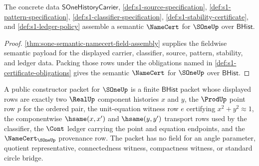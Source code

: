 \begin{theorem}
\label{thm:sone-history-semantic-namecert}
The concrete data $\mathsf{SOneHistoryCarrier}$,
\autoref{def:s1-source-specification}, \autoref{def:s1-pattern-specification},
\autoref{def:s1-classifier-specification},
\autoref{def:s1-stability-certificate}, and \autoref{def:s1-ledger-policy}
assemble a semantic $\NameCert$ for $\SOneUp$ over $\mathsf{BHist}$.
\end{theorem}
\begin{proof}
\autoref{thm:sone-semantic-namecert-field-assembly} supplies the fieldwise
semantic payload for the displayed carrier, classifier, source, pattern,
stability, and ledger data. Packing those rows under the obligations named in
\autoref{def:s1-certificate-obligations} gives the semantic $\NameCert$ for
$\SOneUp$ over $\mathsf{BHist}$.
\end{proof}

\begin{definition}
\label{def:sone-public-constructor-packet}
A public constructor packet for $\SOneUp$ is a finite $\mathsf{BHist}$ packet
whose displayed rows are exactly two $\RealUp$ component histories $x$ and $y$,
the $\ProdUp$ point row $p$ for the ordered pair, the unit-equation witness row
$e$ certifying $x^{2}+y^{2}\approx 1$, the componentwise $\hsame(x,x')$ and
$\hsame(y,y')$ transport rows used by the classifier, the $\Cont$ ledger
carrying the point and equation endpoints, and the $\NameCert_{\SOneUp}$
provenance row. The packet has no field for an angle parameter, quotient
representative, connectedness witness, compactness witness, or standard circle
bridge.
\end{definition}

